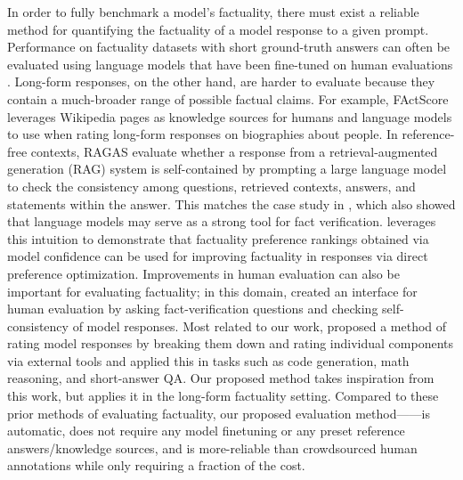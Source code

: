\documentclass{article}
\theoremstyle{plain}
\theoremstyle{definition}
\theoremstyle{remark}
\begin{document}
In order to fully benchmark a model's factuality, there must exist a reliable method for quantifying the factuality of a model response to a given prompt.
Performance on factuality datasets with short ground-truth answers can often be evaluated using language models that have been fine-tuned on human evaluations \citep{lin2022truthfulqa,sellam2020bleurt,lin2004rouge}.
Long-form responses, on the other hand, are harder to evaluate because they contain a much-broader range of possible factual claims.
For example, FActScore \citep{min2023factscore} leverages Wikipedia pages as knowledge sources for humans and language models to use when rating long-form responses on biographies about people.
In reference-free contexts, RAGAS \citep{es2023ragas} evaluate whether a response from a retrieval-augmented generation (RAG) system is self-contained by prompting a large language model to check the consistency among questions, retrieved contexts, answers, and statements within the answer.
This matches the case study in \citet{guan2023language}, which also showed that language models may serve as a strong tool for fact verification.
\citet{tian2023fine} leverages this intuition to demonstrate that factuality preference rankings obtained via model confidence can be used for improving factuality in responses via direct preference optimization.
Improvements in human evaluation can also be important for evaluating factuality; in this domain, \citet{cheng2023relic} created an interface for human evaluation by asking fact-verification questions and checking self-consistency of model responses.
Most related to our work, \citet{chern2023factool} proposed a method of rating model responses by breaking them down and rating individual components via external tools and applied this in tasks such as code generation, math reasoning, and short-answer QA.
Our proposed method takes inspiration from this work, but applies it in the long-form factuality setting.
Compared to these prior methods of evaluating factuality, our proposed evaluation method---\safe{}---is automatic, does not require any model finetuning or any preset reference answers/knowledge sources, and is more-reliable than crowdsourced human annotations while only requiring a fraction of the cost.
\end{document}
